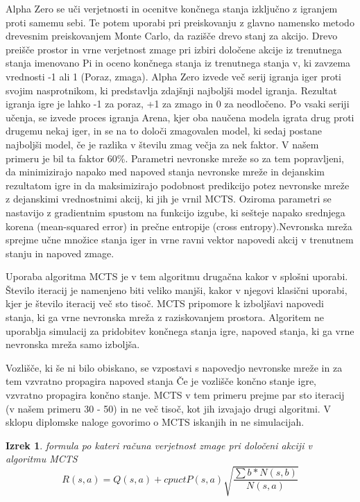 \documentclass[a4paper, 12pt]{book}
\newtheorem{izrek}{Izrek}[chapter]
\begin{document}
Alpha Zero se uči verjetnosti in ocenitve končnega stanja izključno z igranjem proti samemu sebi. 
Te potem uporabi pri preiskovanju z glavno namensko metodo drevesnim preiskovanjem Monte Carlo, da razišče drevo stanj za akcijo.
Drevo preišče prostor in vrne verjetnost zmage pri izbiri določene akcije iz trenutnega stanja imenovano Pi in oceno končnega stanja iz trenutnega stanja v, ki zavzema vrednosti -1 ali 1 (Poraz, zmaga).
Alpha Zero izvede več serij igranja iger proti svojim nasprotnikom, ki predstavlja zdajšnji najboljši model igranja.
Rezultat igranja igre je lahko -1 za poraz, +1 za zmago in 0 za neodločeno.
Po vsaki seriji učenja, se izvede proces igranja Arena, kjer oba naučena modela igrata drug proti drugemu nekaj iger, in se na to določi zmagovalen model, ki sedaj postane najboljši model, če je razlika v številu zmag večja za nek faktor. V našem primeru je bil ta faktor 60\%.
Parametri nevronske mreže so za tem popravljeni, da minimizirajo napako med napoved stanja nevronske mreže in dejanskim rezultatom igre in da maksimizirajo podobnost predikcijo potez nevronske mreže z dejanskimi vrednostnimi akcij, ki jih je vrnil MCTS. 
Oziroma parametri se nastavijo z gradientnim spustom na funkcijo izgube, ki sešteje napako srednjega korena (mean-squared error) in prečne entropije (cross entropy).Nevronska mreža sprejme učne množice stanja iger in vrne ravni vektor napovedi akcij v trenutnem stanju in napoved zmage.

Uporaba algoritma MCTS je v tem algoritmu drugačna kakor v splošni uporabi.
Število iteracij je namenjeno biti veliko manjši, kakor v njegovi klasični uporabi, kjer je število iteracij več sto tisoč. 
MCTS pripomore k izboljšavi napovedi stanja, ki ga vrne nevronska mreža z raziskovanjem prostora.
Algoritem ne uporablja simulacij za pridobitev končnega stanja igre, napoved stanja, ki ga vrne nevronska mreža samo izboljša.

Vozlišče, ki še ni bilo obiskano, se vzpostavi s napovedjo nevronske mreže in za tem vzvratno propagira napoved stanja
Če je vozlišče končno stanje igre, vzvratno propagira končno stanje.
MCTS v tem primeru prejme par sto iteracij (v našem primeru 30 - 50) in ne več tisoč, kot jih izvajajo drugi algoritmi.
V sklopu diplomske naloge govorimo o MCTS iskanjih in ne simulacijah.


\begin{izrek}
	\label{iz:1}
	formula po kateri računa verjetnost zmage pri določeni akciji v algoritmu MCTS
	\begin{equation}
	R(s,a) = Q(s,a) + cpuctP(s, a)\sqrt{\dfrac{\sum{b}*N(s,b)}{N(s,a)}}
	\label{eq:mctsFormula}
	\end{equation}
\end{izrek}
\end{document}
